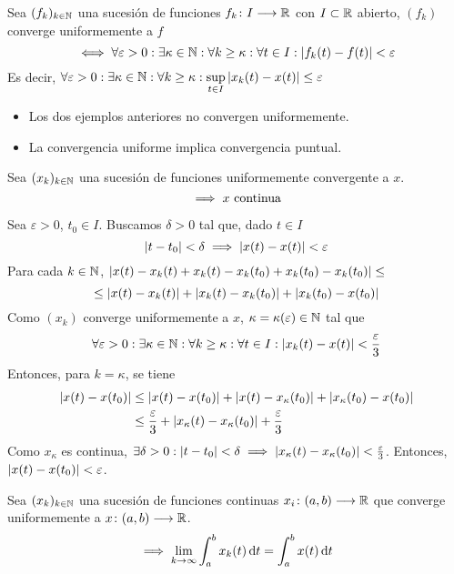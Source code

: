 \begin{defn}
	Sea $(f_k)_{k\in\mathbb{N}}$ una sucesión de funciones $f_k \colon I \longrightarrow \mathbb{R}$ con $I\subset \mathbb{R}$ abierto, $(f_k)$ converge uniformemente a $f$
	\[\iff \forall \varepsilon > 0 : \exists \kappa \in \mathbb{N} : \forall k\geq \kappa : \forall t\in I : \left|f_k(t) - f(t)\right| < \varepsilon\]
	Es decir, $\displaystyle \forall \varepsilon > 0 : \exists \kappa \in \mathbb{N} : \forall k \geq \kappa : \sup_{t\in I} \left|x_k(t)-x(t)\right| \leq \varepsilon$
\end{defn}
\begin{obs}\begin{itemize}
		\item Los dos ejemplos anteriores no convergen uniformemente.
		\item La convergencia uniforme implica convergencia puntual.
	\end{itemize}\end{obs}
\begin{prop}
	Sea $(x_k)_{k\in\mathbb{N}}$ una sucesión de funciones uniformemente convergente a $x$.
	\[\implies x \text{ continua}\]
	\begin{dem}
		Sea $\varepsilon > 0$, $t_0 \in I$. Buscamos $\delta > 0$ tal que, dado $t\in I$
		\[\left|t-t_0\right| < \delta \implies \left|x(t)-x(t)\right|< \varepsilon\]
		Para cada $k\in\mathbb{N}$, $\left|x(t)-x_k(t)+x_k(t)-x_k(t_0)+x_k(t_0)-x_k(t_0)\right| \leq$
		\[\leq \left|x(t)-x_k(t)\right| + \left|x_k(t)-x_k(t_0)\right|  + \left|x_k(t_0)-x(t_0)\right|\]
		Como $(x_k)$ converge uniformemente a $x$, $\kappa = \kappa(\varepsilon) \in \mathbb{N}$ tal que
		\[\forall \varepsilon > 0 : \exists \kappa \in \mathbb{N} : \forall k\geq \kappa : \forall t\in I : \left|x_k(t) - x(t)\right| < \frac{\varepsilon}{3}\]
		Entonces, para $k=\kappa$, se tiene
		\[\begin{aligned}
			\left|x(t)-x(t_0)\right| &\leq \left|x(t)-x(t_0)\right|+\left|x(t)-x_\kappa(t_0)\right| + \left|x_\kappa(t_0)-x(t_0)\right| \\
			&\leq \frac{\varepsilon}{3} + \left|x_\kappa(t)-x_\kappa(t_0)\right| + \frac{\varepsilon}{3} 
		\end{aligned}\]
		Como $x_\kappa$ es continua, $\exists \delta > 0 : \left|t-t_0\right| < \delta \implies \left|x_\kappa(t)-x_\kappa(t_0)\right| < \frac{\varepsilon}{3}$. Entonces, $\left|x(t)-x(t_0)\right| < \varepsilon$.
	\end{dem}
\end{prop}
\begin{prop}
	Sea $(x_k)_{k\in\mathbb{N}}$ una sucesión de funciones continuas $x_i \colon (a,b) \longrightarrow \mathbb{R}$ que converge uniformemente a $x \colon (a,b) \longrightarrow \mathbb{R}$.
	\[\implies \lim_{k\to\infty} \int_{a}^{b} x_k(t) \odif{t} = \int_{a}^{b} x(t) \odif{t}\]
\end{prop}